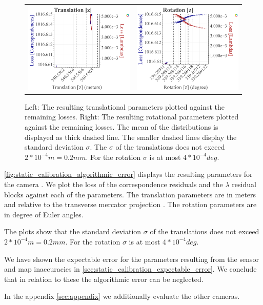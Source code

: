 \begin{figure}[t]
\begin{tabular}{cc}
    \includegraphics[width=0.45 \linewidth]{diagrams/calibration/s40_n_far_small/parameters_all.csv/Translation[z]_vs_Loss[Correspondences]_vs_Loss[Lambdas]_cluster_All.png} &
    \includegraphics[width=0.45 \linewidth]{diagrams/calibration/s40_n_far_small/parameters_all.csv/Rotation[z]_vs_Loss[Correspondences]_vs_Loss[Lambdas]_cluster_All.png} \\
\end{tabular}
\caption{
  Left: The resulting translational parameters plotted against the remaining losses. 
  Right: The resulting rotational parameters plotted against the remaining losses.
  The mean of the distributions is displayed as thick dashed line. The smaller dashed lines display the standard deviation $\sigma$.
  The $\sigma$ of the translations does not exceed $2 * 10^{-4} m = 0.2 mm$.
  For the rotation $\sigma$ is at most $4 * 10^{-4} deg$.
  }
\label{fig:static_calibration_algorithmic_error}
\end{figure}

\autoref{fig:static_calibration_algorithmic_error} displays the resulting parameters for the camera .
We plot the loss of the correspondence residuals and the $\lambda$ residual blocks against each of the parameters.
The translation parameters are in meters and relative to the transverse mercator projection \cite{lambert1894anmerkungen}.
The rotation parameters are in degree of Euler angles.

The plots show that the standard deviation $\sigma$ of the translations does not exceed $2 * 10^{-4} m = 0.2 mm$.
For the rotation $\sigma$ is at most $4 * 10^{-4} deg$. 

We have shown the expectable error for the parameters resulting from the sensor and map inaccuracies in \autoref{sec:static_calibration_expectable_error}. 
We conclude that in relation to these the algorithmic error can be neglected.

In the appendix \autoref{sec:appendix} we additionally evaluate the other cameras.

